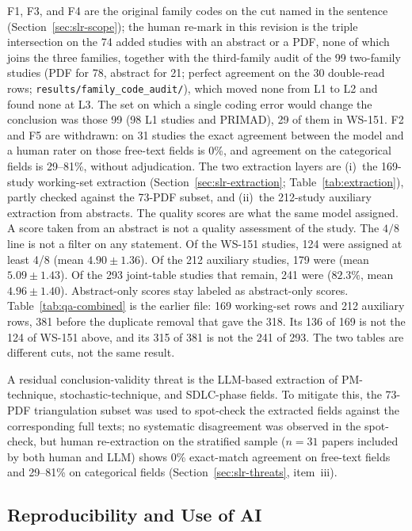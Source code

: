 F1, F3, and F4 are the original family codes on the cut named in the
sentence (Section~\ref{sec:slr-scope}); the human re-mark in this
revision is the triple intersection on the 74 added studies with an
abstract or a PDF, none of which joins the three families, together with
the third-family audit of the 99 two-family studies (PDF for 78,
abstract for 21; perfect agreement on the 30 double-read rows;
\texttt{results/family\_code\_audit/}), which moved none from L1 to L2
and found none at L3. The set on which a single coding error would change
the conclusion was those 99 (98 L1 studies and PRIMAD), 29 of them in
WS-151. F2 and F5 are withdrawn: on 31 studies the exact agreement
between the model and a human rater on those free-text fields is 0\%, and
agreement on the categorical fields is 29--81\%, without adjudication.
The two extraction layers are (i)~the 169-study working-set extraction
(Section~\ref{sec:slr-extraction}; Table~\ref{tab:extraction}), partly
checked against the 73-PDF subset, and (ii)~the 212-study auxiliary
extraction from abstracts. The quality scores are what the same model
assigned. A score taken from an abstract is not a quality assessment of
the study. The $4/8$
line is not a filter on any statement. Of the WS-151 studies, 124 were
assigned at least 4/8 (mean $4.90 \pm 1.36$). Of the 212
auxiliary studies, 179 were (mean $5.09 \pm 1.43$). Of the 293 joint-table
studies that remain, 241 were ($82.3\%$, mean $4.96 \pm 1.40$).
Abstract-only scores stay labeled as
abstract-only scores. Table~\ref{tab:qa-combined} is the earlier file: 169
working-set rows and 212 auxiliary rows, 381 before the duplicate removal
that gave the 318. Its 136 of 169 is not the 124 of WS-151 above, and its
315 of 381 is not the 241 of 293. The two tables are different cuts, not
the same result.



A residual conclusion-validity threat is the LLM-based extraction of
PM-technique, stochastic-technique, and SDLC-phase fields. To mitigate this,
the 73-PDF triangulation subset was used to spot-check the extracted fields
against the corresponding full texts; no systematic disagreement was
observed in the spot-check, but human re-extraction on the stratified sample
($n=31$ papers included by both human and LLM) shows 0\% exact-match
agreement on free-text fields and 29--81\% on categorical fields
(Section~\ref{sec:slr-threats}, item~iii).


\subsection{Reproducibility and Use of AI}
\label{sec:slr-replication}

